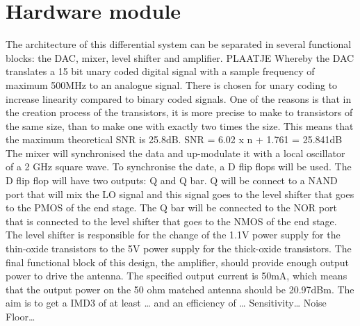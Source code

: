 \section{Hardware module}\label{sec:overview}
The architecture of this differential system can be separated in several functional blocks: the DAC, mixer, level shifter and amplifier.
PLAATJE
Whereby the DAC translates a 15 bit unary coded digital signal with a sample frequency of maximum 500MHz to an analogue signal. There is chosen for unary coding to increase linearity compared to binary coded signals. One of the reasons is that in the creation process of the transistors, it is more precise to make to transistors of the same size, than to make one with exactly two times the size. This means that the maximum theoretical SNR is 25.8dB.
SNR = 6.02 x n + 1.761 = 25.841dB 
The mixer will synchronised the data and up-modulate it with a local oscillator of a 2 GHz square wave. To synchronise the date, a D flip flops will be used. The D flip flop will have two outputs: Q and Q bar. Q will be connect to a NAND port that will mix the LO signal and this signal goes to the level shifter that goes to the PMOS of the end stage.  The Q bar will be connected to the NOR port that is connected to the level shifter that goes to the NMOS of the end stage.
The level shifter is responsible for the change of the 1.1V power supply for the thin-oxide transistors to the 5V power supply for the thick-oxide transistors.
The final functional block of this design, the amplifier, should provide enough output power to drive the antenna. The specified output current is 50mA, which means that the output power on the 50 ohm matched antenna should be 20.97dBm.
The aim is to get a IMD3 of at least … and an efficiency of … 
Sensitivity…
Noise Floor…
